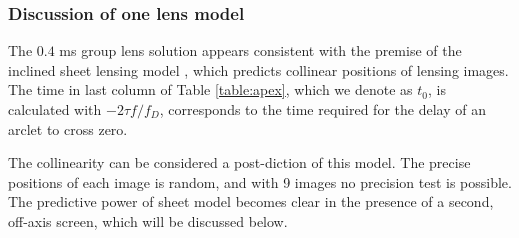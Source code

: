 \documentclass[useAMS,usenatbib]{mn2e}
\begin{document}



\subsubsection{Discussion of one lens model}
\label{222}
The $0.4$ ms group lens solution appears consistent with the premise
of the inclined sheet lensing model \citep{2014MNRAS.442.3338P}, which
predicts collinear positions of lensing images.  The time in last
column of Table \ref{table:apex}, which we denote as $t_0$, is
calculated with $-2{\tau}f/{f_{D}}$, corresponds to the time required
for the delay of an arclet to cross zero.

The collinearity can be considered a post-diction of this model.  The
precise positions of each image is random, and with 9 images no
precision test is possible.  The predictive power of sheet model
becomes clear in the presence of a second, off-axis screen, which will be discussed below.


\end{document}
